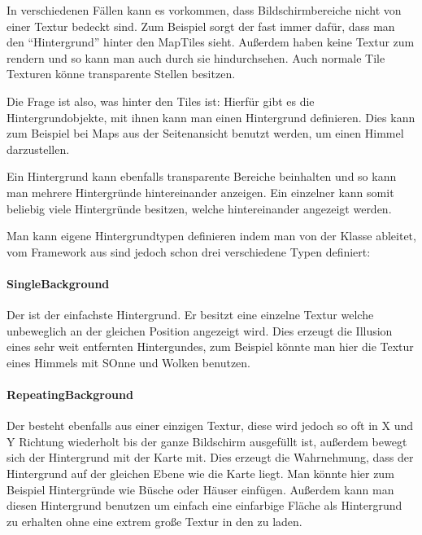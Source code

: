 In verschiedenen Fällen kann es vorkommen, dass Bildschirmbereiche nicht von einer Textur bedeckt sind. Zum Beispiel sorgt der  fast immer dafür, dass man den ``Hintergrund'' hinter den MapTiles sieht. Außerdem haben  keine Textur zum rendern und so kann man auch durch sie hindurchsehen. Auch normale Tile Texturen könne transparente Stellen besitzen.

Die Frage ist also, was hinter den Tiles ist: Hierfür gibt es die Hintergrundobjekte, mit ihnen kann man einen Hintergrund definieren.
Dies kann zum Beispiel bei Maps aus der Seitenansicht benutzt werden, um einen Himmel darzustellen.


Ein Hintergrund kann ebenfalls transparente Bereiche beinhalten und so kann man mehrere Hintergründe hintereinander anzeigen. Ein einzelner  kann somit beliebig viele Hintergründe besitzen, welche hintereinander angezeigt werden. 

Man kann eigene Hintergrundtypen definieren indem man von der Klasse  ableitet, vom Framework aus sind jedoch schon drei verschiedene Typen definiert:

\paragraph{SingleBackground}

Der  ist der einfachste Hintergrund. Er besitzt eine einzelne Textur welche unbeweglich an der gleichen Position angezeigt wird.
Dies erzeugt die Illusion eines sehr weit entfernten Hintergundes, zum Beispiel könnte man hier die Textur eines Himmels mit SOnne und Wolken benutzen.

\paragraph{RepeatingBackground}

Der  besteht ebenfalls aus einer einzigen Textur, diese wird jedoch so oft in X und Y Richtung wiederholt bis der ganze Bildschirm ausgefüllt ist, außerdem bewegt sich der Hintergrund mit der Karte mit. Dies erzeugt die Wahrnehmung, dass der Hintergrund auf der gleichen Ebene wie die Karte liegt. Man könnte hier zum Beispiel Hintergründe wie Büsche oder Häuser einfügen. 
Außerdem kann man diesen Hintergrund benutzen um einfach eine einfarbige Fläche als Hintergrund zu erhalten ohne eine extrem große Textur in den  zu laden.

